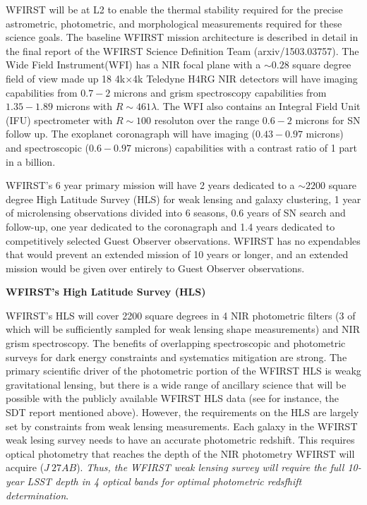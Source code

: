 WFIRST will be at L2 to enable the thermal stability required for the
precise astrometric, photometric, and morphological measurements
required for these science goals. The baseline WFIRST mission
architecture is described in detail in the final report of the WFIRST
Science Definition Team (arxiv/1503.03757). The Wide Field
Instrument(WFI) has a NIR focal plane with a $\sim0.28$ square degree
field of view made up 18 4k$\times$4k Teledyne H4RG NIR detectors will
have imaging capabilities from $0.7-2$ microns and grism spectroscopy
capabilities from $1.35-1.89$ microns with $R\sim461\lambda$.  The WFI
also contains an Integral Field Unit (IFU) spectrometer with $R\sim100$
resoluton over the range $0.6-2$ microns for SN follow up. The exoplanet
coronagraph will have imaging ($0.43-0.97$ microns) and spectroscopic
($0.6-0.97 $ microns) capabilities with a contrast ratio of 1 part in a
billion.

WFIRST's  6 year primary mission will have 2 years dedicated to a
$\sim2200$ square degree High Latitude Survey (HLS) for weak lensing and
galaxy clustering,  1 year of microlensing observations divided into 6
seasons, $0.6$ years of SN search and follow-up, one year dedicated to
the coronagraph and 1.4 years dedicated to competitively selected Guest
Observer observations. WFIRST has no expendables that would prevent an
extended mission of 10 years or longer, and an extended mission would be
given over entirely to Guest Observer observations.

\textbf{WFIRST's High Latitude Survey (HLS)}

WFIRST's HLS will cover 2200 square degrees in 4 NIR photometric filters
(3 of which will be sufficiently sampled for weak lensing shape
measurements) and NIR grism spectroscopy.  The benefits of overlapping
spectroscopic and photometric surveys for dark energy constraints and
systematics mitigation are strong.  The primary scientific driver of the
photometric portion of the WFIRST HLS is weakg gravitational lensing,
but there is a wide range of ancillary science that will be possible
with the publicly available WFIRST HLS data (see for instance, the SDT
report mentioned above).  However, the requirements on the HLS are
largely set by constraints from weak lensing measurements.  Each galaxy
in the WFIRST weak lesing survey needs to have an accurate photometric
redshift.  This requires optical photometry that reaches the depth of
the NIR photometry WFIRST will acquire ($J~27AB$).  \emph{Thus, the
WFIRST weak lensing survey will require the full  10-year LSST depth in
4 optical bands for optimal photometric redsfhift determination}.

